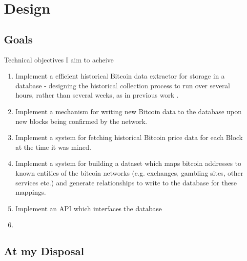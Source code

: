 \chapter{Design}

\section{Goals}
Technical objectives I aim to acheive
\begin{enumerate}
    \item Implement a efficient historical Bitcoin data extractor for storage in a database - designing the historical collection process to run over several hours, rather than several weeks, as in previous work \cite{RefWorks:doc:5c98e031e4b068320632cef2}.
    \item Implement a mechanism for writing new Bitcoin data to the database upon new blocks being confirmed by the network.
    \item Implement a system for fetching historical Bitcoin price data for each Block at the time it was mined.
    \item Implement a system for building a dataset which maps bitcoin addresses to known entities of the bitcoin networks (e.g. exchanges, gambling sites, other services etc.) and generate relationships to write to the database for these mappings.
    \item Implement an API which interfaces the database
    \item {}
\end{enumerate}

\section{At my Disposal} 

